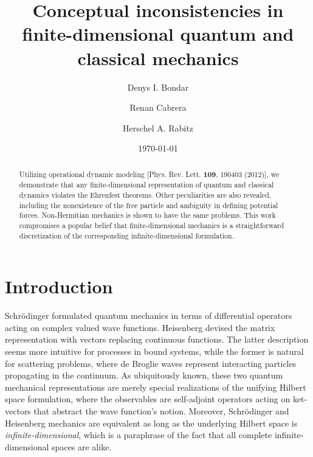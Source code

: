 \documentclass[twocolumn,pra,aps,showpacs,preprintnumbers,nofootinbib, superscriptaddress, amsmath,amssymb]{revtex4}
\begin{document}
\author{Denys I. Bondar}

\author{Renan Cabrera}

\author{Herschel A. Rabitz}


\title{Conceptual inconsistencies in finite-dimensional quantum and classical mechanics}

\begin{abstract}
Utilizing operational dynamic modeling [Phys. Rev. Lett. {\bf 109}, 190403 (2012)], we demonstrate that any finite-dimensional representation of quantum and classical dynamics violates the Ehrenfest theorems. Other peculiarities are also revealed, including the nonexistence of the free particle and ambiguity in defining potential forces. Non-Hermitian mechanics is shown to have the same problems. This work compromises a popular belief that finite-dimensional mechanics 
is a straightforward discretization of the corresponding infinite-dimensional formulation. 
\end{abstract}

\date{\today} 

	
\maketitle 

\section{Introduction} 

Schr\"{o}dinger formulated quantum mechanics in terms of differential operators acting on complex valued wave functions. Heisenberg devised the matrix representation with vectors replacing continuous functions. The latter description seems more intuitive for processes in bound systems, while the former is natural for scattering problems, where de Broglie waves represent interacting particles propagating in the continuum. As ubiquitously known, these two quantum mechanical representations are merely special realizations of the unifying Hilbert space formulation, where the observables are self-adjoint operators acting on ket-vectors that abstract the wave function's notion. Moreover, Schr\"{o}dinger and Heisenberg mechanics are equivalent as long as the underlying Hilbert space is {\it infinite-dimensional}, which is a paraphrase of the fact that all complete infinite-dimensional spaces are alike.
\end{document}
